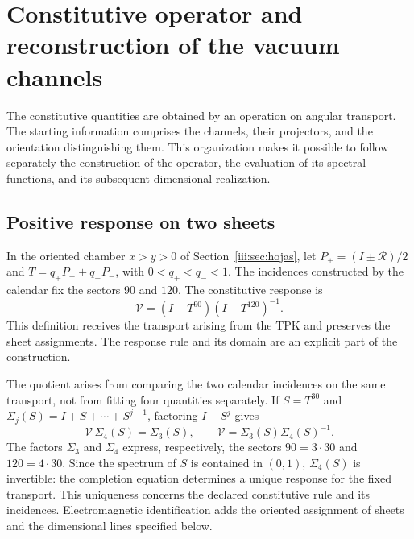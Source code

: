 \section{Constitutive operator and reconstruction of the vacuum channels}
\label{iii:sec:constitutiva}

The constitutive quantities are obtained by an operation on angular
transport. The starting information comprises the channels, their
projectors, and the orientation distinguishing them. This organization makes it possible
to follow separately the construction of the operator, the evaluation of its
spectral functions, and its subsequent dimensional realization.

\subsection{Positive response on two sheets}

In the oriented chamber $x>y>0$ of Section~\ref{iii:sec:hojas}, let
$P_\pm=(I\pm\mathcal R)/2$ and
$T=q_+P_++q_-P_-$, with $0<q_+<q_-<1$. The incidences constructed by the
calendar fix the sectors $90$ and $120$. The constitutive response is
\begin{equation}
 \mathcal V=(I-T^{90})(I-T^{120})^{-1}.
 \label{iii:eq:vacuum-op}
\end{equation}
This definition receives the transport arising from the TPK and preserves the
sheet assignments. The response rule and its domain are an explicit part
of the construction.

The quotient arises from comparing the two calendar incidences on
the same transport, not from fitting four quantities separately. If
$S=T^{30}$ and $\Sigma_j(S)=I+S+\cdots+S^{j-1}$, factoring
$I-S^j$ gives
\begin{equation}
 \mathcal V\,\Sigma_4(S)=\Sigma_3(S),\qquad
 \mathcal V=\Sigma_3(S)\Sigma_4(S)^{-1}.
 \label{iii:eq:completion-response}
\end{equation}
The factors $\Sigma_3$ and $\Sigma_4$ express, respectively, the
sectors $90=3\cdot30$ and $120=4\cdot30$. Since the spectrum of $S$ is
contained in $(0,1)$, $\Sigma_4(S)$ is invertible: the completion
equation determines a unique response for the fixed transport.
This uniqueness concerns the declared constitutive rule and its
incidences. Electromagnetic identification adds the oriented
assignment of sheets and the dimensional lines specified
below.

